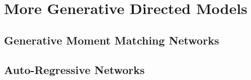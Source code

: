 \newpage
\section{More Generative Directed Models}
\label{sec:more}

\subsection{Generative Moment Matching Networks}
\label{sub:more_mmn}

\vspace{10cm}

\subsection{Auto-Regressive Networks}
\label{sub:more_arn}





